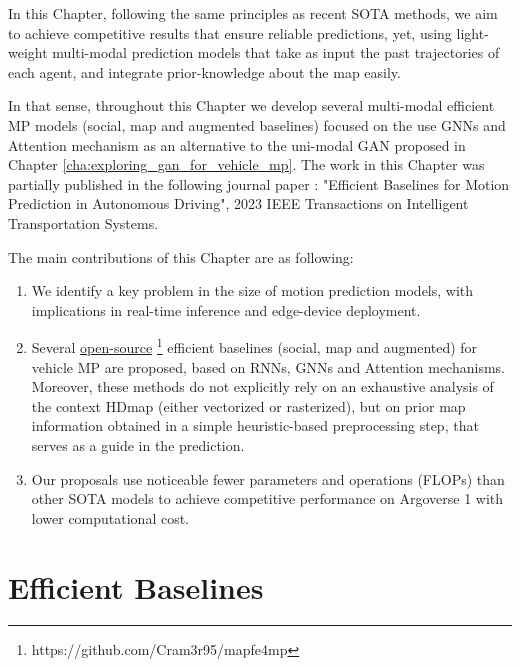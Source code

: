 In this Chapter, following the same principles as recent \ac{SOTA} methods, we aim to achieve competitive results that ensure reliable predictions, yet, using light-weight multi-modal prediction models that take as input the past trajectories of each agent, and integrate prior-knowledge about the map easily.

In that sense, throughout this Chapter we develop several multi-modal efficient \ac{MP} models (social, map and augmented baselines) focused on the use \acfp{GNN} and Attention mechanism as an alternative to the uni-modal \ac{GAN} proposed in Chapter \ref{cha:exploring_gan_for_vehicle_mp}. The work in this Chapter was partially published in the following journal paper \cite{gomez2023efficientbaselines}: "Efficient Baselines for Motion Prediction in Autonomous Driving", 2023 IEEE Transactions on Intelligent Transportation Systems.

The main contributions of this Chapter are as following: 

\begin{enumerate}
	
	\item We identify a key problem in the size of motion prediction models, with implications in real-time inference and edge-device deployment.
	
	\item Several \href{https://github.com/Cram3r95/mapfe4mp}{open-source} \footnote{https://github.com/Cram3r95/mapfe4mp} efficient baselines (social, map and augmented) for vehicle \ac{MP} are proposed, based on \acp{RNN}, \acp{GNN} and Attention mechanisms. Moreover, these methods do not explicitly rely on an exhaustive analysis of the context \ac{HDmap} (either vectorized or rasterized), but on prior map information obtained in a simple heuristic-based preprocessing step, that serves as a guide in the prediction.
	
	\item Our proposals use noticeable fewer parameters and operations (\acfp{FLOP}) than other \ac{SOTA} models to achieve competitive performance on Argoverse 1 \cite{chang2019argoverse} with lower computational cost.
	
\end{enumerate} 

\section{Efficient Baselines}
\label{sec:6_efficient_baselines}

